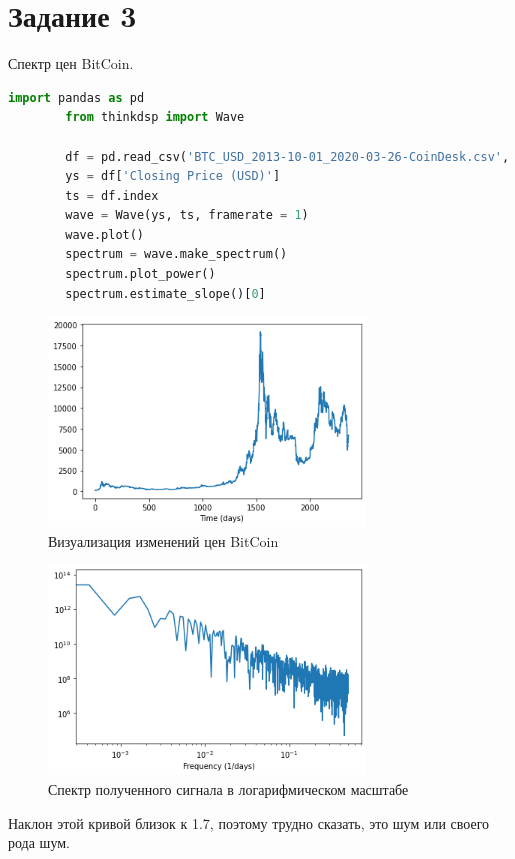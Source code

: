 \documentclass[a4paper, 12pt]{report}
\begin{document}
	\section{Задание 3}
	Спектр цен BitCoin.
	\begin{lstlisting}[language=Python,caption=BitCoin]
		import pandas as pd
		from thinkdsp import Wave

		df = pd.read_csv('BTC_USD_2013-10-01_2020-03-26-CoinDesk.csv', parse_dates=[0])
		ys = df['Closing Price (USD)']
		ts = df.index
		wave = Wave(ys, ts, framerate = 1)
		wave.plot()
		spectrum = wave.make_spectrum()
		spectrum.plot_power()
		spectrum.estimate_slope()[0]
	\end{lstlisting}
	\begin{figure}[H]
		\centering
		\includegraphics[width=0.75\textwidth]{result1.png}
		\caption{Визуализация изменений цен BitCoin}
		\label{fig:result1}
	\end{figure}
	\begin{figure}[H]
		\centering
		\includegraphics[width=0.75\textwidth]{result2.png}
		\caption{Спектр полученного сигнала в логарифмическом масштабе}
		\label{fig:result2}
	\end{figure}
	Наклон этой кривой близок к 1.7, поэтому трудно сказать, это  шум или своего рода  шум.	
\end{document}

